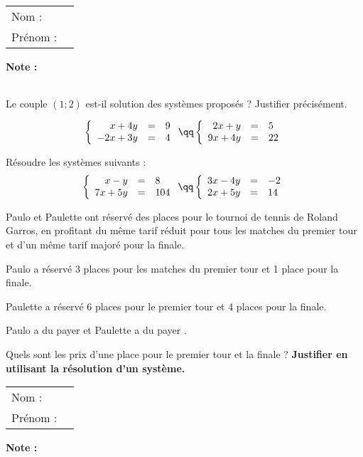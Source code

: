 \documentclass[10pt,french]{book}
\newcommand\presentation{
\setcounter{exo}{0}
    \begin{tabular}{ll}
        Nom : \\[5pt]
        Prénom :
    \end{tabular}
\hfill
    \textbf{Note :}
        \renewcommand\arraystretch{2.3}
    \begin{tabular}{|c|}
        \hline
            \slashbox{\Huge\bfseries\phantom{10}}{\Huge\bfseries 10}\\
        \hline
    \end{tabular}
        \renewcommand\arraystretch{1.5}\par\vspace*{1cm}
    \hrulefill
}
\begin{document}

\presentation

\exo Le couple $(1;2)$ est-il solution des systèmes proposés ? Justifier précisément.

\[\left\{\begin{array}{rcl}
                x+4y&=&9\\
                -2x+3y&=&4\\
            \end{array}
    \right.
\qq
    \left\{\begin{array}{rcl}
            2x+y&=&5\\
            9x+4y&=&22\\
        \end{array}
    \right.\]

\exo Résoudre les systèmes suivants :
\[\left\{\begin{array}{rcl}
                x-y&=&8\\
                7x+5y&=&104\\
            \end{array}
    \right.
\qq
    \left\{\begin{array}{rcll}
            3x - 4y & = & -2\\
            2x + 5y & = & 14\\
        \end{array}
    \right.\]

\exo

Paulo et Paulette ont réservé des places pour le tournoi de tennis de Roland Garros, en profitant du même tarif réduit pour tous les matches du premier tour et d'un même tarif majoré pour la finale.\par
Paulo a réservé 3 places pour les matches du premier tour et 1 place pour la finale.\par
Paulette a réservé 6 places pour le premier tour et 4 places pour la finale.\par
Paulo  a du payer  et Paulette a du payer .\par
Quels sont les prix d'une place pour le premier tour et la finale ? \textbf{Justifier en utilisant la résolution d'un système.}

\clearpage


\setcounter{exo}{0}

\presentation
\end{document}
